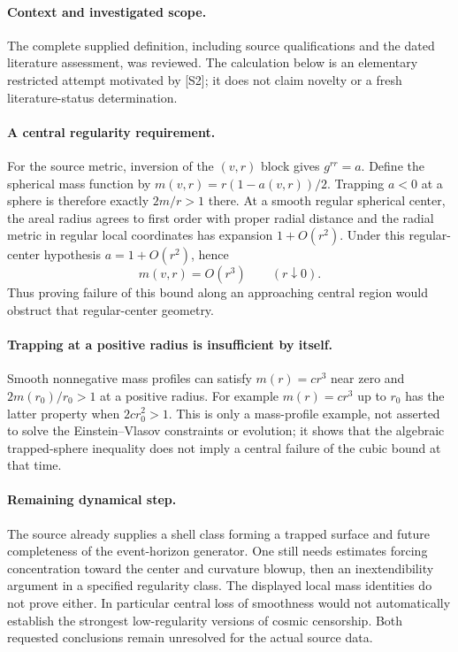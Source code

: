 \documentclass[11pt]{article}
\begin{document}
\paragraph{Context and investigated scope.} The complete supplied definition, including source qualifications and the dated literature assessment, was reviewed. The calculation below is an elementary restricted attempt motivated by [S2]; it does not claim novelty or a fresh literature-status determination.

\paragraph{A central regularity requirement.} For the source metric, inversion of the $(v,r)$ block gives $g^{rr}=a$. Define the spherical mass function by $m(v,r)=r(1-a(v,r))/2$. Trapping $a<0$ at a sphere is therefore exactly $2m/r>1$ there. At a smooth regular spherical center, the areal radius agrees to first order with proper radial distance and the radial metric in regular local coordinates has expansion $1+O(r^2)$. Under this regular-center hypothesis $a=1+O(r^2)$, hence
\[
 m(v,r)=O(r^3)\qquad(r\downarrow0).
\]
Thus proving failure of this bound along an approaching central region would obstruct that regular-center geometry.

\paragraph{Trapping at a positive radius is insufficient by itself.} Smooth nonnegative mass profiles can satisfy $m(r)=cr^3$ near zero and $2m(r_0)/r_0>1$ at a positive radius. For example $m(r)=cr^3$ up to $r_0$ has the latter property when $2cr_0^2>1$. This is only a mass-profile example, not asserted to solve the Einstein--Vlasov constraints or evolution; it shows that the algebraic trapped-sphere inequality does not imply a central failure of the cubic bound at that time.

\paragraph{Remaining dynamical step.} The source already supplies a shell class forming a trapped surface and future completeness of the event-horizon generator. One still needs estimates forcing concentration toward the center and curvature blowup, then an inextendibility argument in a specified regularity class. The displayed local mass identities do not prove either. In particular central loss of smoothness would not automatically establish the strongest low-regularity versions of cosmic censorship. Both requested conclusions remain unresolved for the actual source data.
\end{document}
